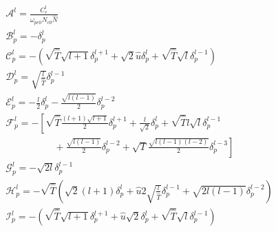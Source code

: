 \documentclass[final]{jpp}
\begin{document}
\begin{align}
&\mathcal{A}^l=  \frac{C_e^l}{\omega_{pe0}N_{e0}\hat{N}}\\
&\mathcal{B}_p^l= -\delta_p^l\\
&\mathcal{C}_p^l=-\left(\sqrt{\hat{T}} \sqrt{l+1}\delta_p^{l+1}+ \sqrt{2}\hat{u} \delta_{p}^{l} +\sqrt{\hat{T}} \sqrt{l}\delta_p^{l-1} \right)\\
&\mathcal{D}_p^l=\sqrt{\frac{l}{\hat{T}}} \delta_p^{l-1} \\
&\mathcal{E}_p^l=- \frac{l}{2}\delta_p^l -\frac{\sqrt{l(l-1)}}{2}\delta_p^{l-2} \\
&\mathcal{F}_p^l=-\left[\sqrt{\hat{T}} \frac{(l+1)\sqrt{l+1}}{2} \delta_p^{l+1} + \frac{l}{\sqrt{2}} \delta_p^l  +\sqrt{\hat{T}}  l \sqrt{l}\delta_p^{l-1}\right. \nonumber\\
& \left.  \;\;\;\;\;\;\;\;\;\;\;\;\;\;\;\;\;\;+  \frac{\sqrt{l(l-1)}}{2}   \delta_p^{l-2}  + \sqrt{T} \frac{\sqrt{l(l-1)(l-2)}}{2} \delta_p^{l-3} \right] \\
&\mathcal{G}_p^l=- \sqrt{2l}\delta_p^{l-1} \nonumber\\
&\mathcal{H}_p^l=  - \sqrt{\hat{T}} \left( \sqrt{2}(l+1) \delta_p^l+ \hat{u}2\sqrt{\frac{l}{\hat{T}}}  \delta_p^{l-1} + \sqrt{2l(l-1)} \delta_p^{l-2} \right) \\
&\mathcal{I}_p^l=-\left(\sqrt{\hat{T}} \sqrt{l+1}\delta_p^{l+1}+\hat{u}\sqrt{2}\delta_p^l + \sqrt{\hat{T}} \sqrt{l}\delta_p^{l-1} \right)

\end{align}
\end{document}
